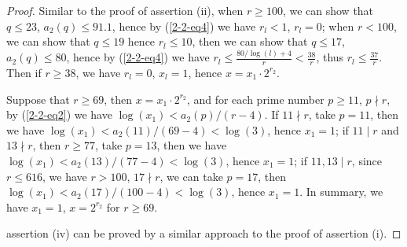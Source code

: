 \documentclass[a4paper, 12pt]{article}
\numberwithin{equation}{section}
\theoremstyle{definition}
\begin{document}
\begin{proof}
Similar to the proof of assertion (ii), when $r\ge 100$, we can show that $q\le 23$, $a_2(q) \le 91.1$, hence by (\ref{2-2-eq4}) we have $r_l < 1$, $r_l = 0$;
when $r < 100$, we can show that $q\le 19$ hence $r_l \le 10$, then we can show that $q\le 17$, $a_2(q) \le 80$, hence by (\ref{2-2-eq4}) we have $r_l \le \frac{80/\log(l)+4}{r} < \frac{38}{r}$, thus $r_l \le \frac{37}{r}$.
Then if $r\ge 38$, we have $r_l = 0$, $x_l = 1$, hence $x = x_1 \cdot 2^{r_2}$.

Suppose that  $r\ge 69$, then $x = x_1 \cdot 2^{r_2}$, and for each prime number $p\ge 11$, $p\nmid r$, by (\ref{2-2-eq2}) we have $\log(x_1) < a_2(p) / (r - 4)$.
If $11\nmid r$, take $p=11$, then we have $\log(x_1) < a_2(11) / (69 - 4) < \log(3)$, hence $x_1 = 1$; 
if $11\mid r$ and $13\nmid r$, then $r\ge 77$, take $p=13$, then we have $\log(x_1) < a_2(13) / (77 - 4) < \log(3)$, hence $x_1 = 1$; 
if $11,13\mid r$, since $r\le 616$, we have $r > 100$, $17\nmid r$, we can take  $p=17$, then $\log(x_1) < a_2(17) / (100 - 4) < \log(3)$, hence $x_1 = 1$.
In summary, we have $x_1 = 1$, $x = 2^{r_2}$ for $r\ge 69$.

assertion (iv) can be proved by a similar approach to the proof of assertion (i).
\end{proof}
\end{document}
